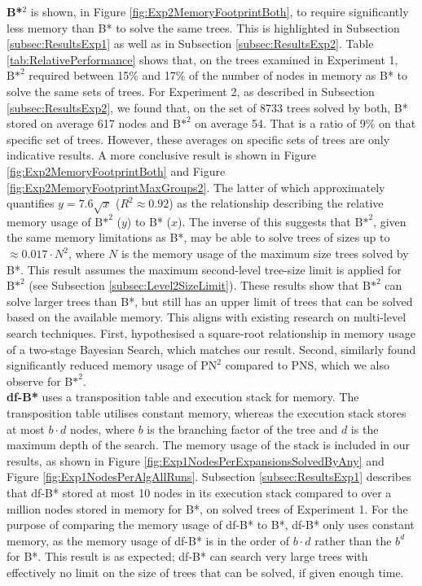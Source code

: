 \noindent \textbf{B*}$^2$ is shown, in Figure \ref{fig:Exp2MemoryFootprintBoth}, to require significantly less memory than B* to solve the same trees. This is highlighted in Subsection \ref{subsec:ResultsExp1} as well as in Subsection \ref{subsec:ResultsExp2}. Table \ref{tab:RelativePerformance} shows that, on the trees examined in Experiment 1, ${\text{B*}}^2$ required between 15\% and 17\% of the number of nodes in memory as B* to solve the same sets of trees. For Experiment 2, as described in Subsection \ref{subsec:ResultsExp2}, we found that, on the set of 8733 trees solved by both, B* stored on average 617 nodes and ${\text{B*}}^2$ on average 54. That is a ratio of 9\% on that specific set of trees. However, these averages on specific sets of trees are only indicative results. A more conclusive result is shown in Figure \ref{fig:Exp2MemoryFootprintBoth} and Figure \ref{fig:Exp2MemoryFootprintMaxGroups2}. The latter of which approximately quantifies $y=7.6\sqrt{x}$ ($R^2\approx0.92$) as the relationship describing the relative memory usage of ${\text{B*}}^2$ ($y$) to B* ($x$). The inverse of this suggests that ${\text{B*}}^2$, given the same memory limitations as B*, may be able to solve trees of sizes up to $\approx0.017\cdot N^2$, where $N$ is the memory usage of the maximum size trees solved by B*.
This result assumes the maximum second-level tree-size limit is applied for ${\text{B*}}^2$ (see Subsection \ref{subsec:Level2SizeLimit}).
These results show that ${\text{B*}}^2$ can solve larger trees than B*, but still has an upper limit of trees that can be solved based on the available memory.
This aligns with existing research on multi-level search techniques. First,  hypothesised a square-root relationship in memory usage of a two-stage Bayesian Search, which matches our result. Second,  similarly found significantly reduced memory usage of ${\text{PN}}^2$ compared to PNS, which we also observe for ${\text{B*}}^2$.\\

\noindent \textbf{df-B*} uses a transposition table and execution stack for memory. The transposition table utilises constant memory, whereas the execution stack stores at most $b\cdot d$ nodes, where $b$ is the branching factor of the tree and $d$ is the maximum depth of the search. The memory usage of the stack is included in our results, as shown in Figure \ref{fig:Exp1NodesPerExpansionsSolvedByAny} and Figure \ref{fig:Exp1NodesPerAlgAllRuns}. Subsection \ref{subsec:ResultsExp1} describes that df-B* stored at most 10 nodes in its execution stack compared to over a million nodes stored in memory for B*, on solved trees of Experiment 1. For the purpose of comparing the memory usage of df-B* to B*, df-B* only uses constant memory, as the memory usage of df-B* is in the order of $b\cdot d$ rather than the $b^d$ for B*.
This result is as expected; df-B* can search very large trees with effectively no limit on the size of trees that can be solved, if given enough time.

